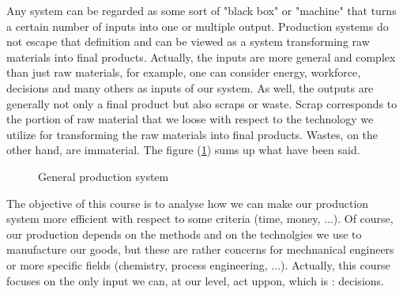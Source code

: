 Any system can be regarded as some sort of "black box" or "machine" that turns a certain number of inputs into one or multiple output. Production systems do not escape that definition and can be viewed as a system transforming raw materials into final products. Actually, the inputs are more general and complex than just raw materials, for example, one can consider energy, workforce, decisions and many others as inputs of our system. As well, the outputs are generally not only a final product but also scraps or waste. Scrap corresponds to the portion of raw material that we loose with respect to the technology we utilize for transforming the raw materials into final products. Wastes, on the other hand, are immaterial. The figure (\ref{intro:production-system}) sums up what have been said.

\begin{figure}[h!]
    \centering
    \caption{\label{intro:production-system}General production system}
\end{figure}

The objective of this course is to analyse how we can make our production system more efficient with respect to some criteria (time, money, ...). Of course, our production depends on the methods and on the technolgies we use to manufacture our goods, but these are rather concerns for mechnanical engineers or more specific fields (chemistry, process engineering, ...). Actually, this course focuses on the only input we can, at our level, act uppon, which is : decisions.

